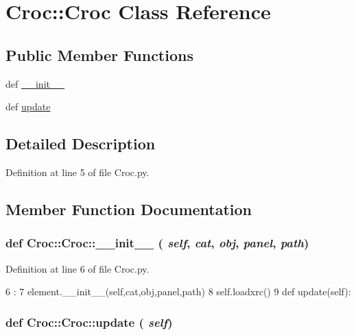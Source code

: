 \hypertarget{classCroc_1_1Croc}{
\section{Croc::Croc Class Reference}
\label{classCroc_1_1Croc}
}
\subsection*{Public Member Functions}
\begin{DoxyCompactItemize}
\item 
def \hyperlink{classCroc_1_1Croc_a21892155d294299cd74ca9d63d53be22}{\_\-\_\-init\_\-\_\-}
\item 
def \hyperlink{classCroc_1_1Croc_aa820512e01d76fe06063cc53d2ddb192}{update}
\end{DoxyCompactItemize}


\subsection{Detailed Description}


Definition at line 5 of file Croc.py.

\subsection{Member Function Documentation}
\hypertarget{classCroc_1_1Croc_a21892155d294299cd74ca9d63d53be22}{
\subsubsection[{\_\-\_\-init\_\-\_\-}]{\setlength{\rightskip}{0pt plus 5cm}def Croc::Croc::\_\-\_\-init\_\-\_\- ( {\em self}, \/   {\em cat}, \/   {\em obj}, \/   {\em panel}, \/   {\em path})}}
\label{classCroc_1_1Croc_a21892155d294299cd74ca9d63d53be22}


Definition at line 6 of file Croc.py.


\begin{DoxyCode}
6                                              :
7         element.__init__(self,cat,obj,panel,path)
8         self.loadxrc()
9 
    def update(self):
\end{DoxyCode}
\hypertarget{classCroc_1_1Croc_aa820512e01d76fe06063cc53d2ddb192}{
\subsubsection[{update}]{\setlength{\rightskip}{0pt plus 5cm}def Croc::Croc::update ( {\em self})}}
\label{classCroc_1_1Croc_aa820512e01d76fe06063cc53d2ddb192}


